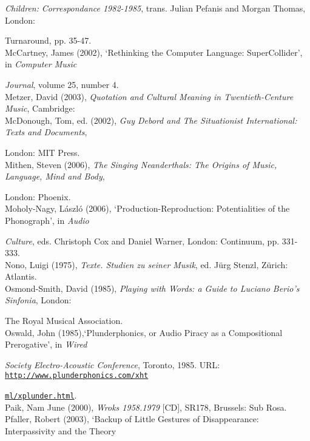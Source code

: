 \emph{Children:} \emph{Correspondance 1982-1985}, trans. Julian Pefanis and Morgan Thomas, London: 

Turnaround, pp. 35-47. 
\hypertarget{mccartney}{}\\
McCartney, James (2002), `Rethinking the Computer Language: SuperCollider', in \emph{Computer Music} 

\emph{Journal}, volume 25, number 4.
\hypertarget{metzer}{}\\
Metzer, David (2003), \emph{Quotation and Cultural Meaning in Twentieth-Centure Music}, Cambridge: 
\hypertarget{mcdonough}{}\\
McDonough, Tom, ed. (2002), \emph{Guy Debord and The Situationist International: Texts and Documents}, 

London: MIT Press. 
\hypertarget{mithen}{}\\
Mithen, Steven (2006), \emph{The Singing Neanderthals: The Origins of Music, Language, Mind and Body}, 

London: Phoenix. 
\hypertarget{moholy}{}\\
Moholy-Nagy, L\'{a}szl\'{o} (2006),  `Production-Reproduction: Potentialities of the Phonograph', in \emph{Audio} 

\emph{Culture}, eds. Christoph Cox and Daniel Warner, London: Continuum, pp. 331-333.
\hypertarget{nono}{}\\
Nono, Luigi (1975), \emph{Texte. Studien zu seiner Musik}, ed. J\"{u}rg Stenzl, Z\"{u}rich: Atlantis. 
\hypertarget{ossmith}{}\\
Osmond-Smith, David (1985), \emph{Playing with Words: a Guide to Luciano Berio's Sinfonia},  London: 

The Royal Musical Association. 
\hypertarget{oswald}{}\\
Oswald, John (1985),`Plunderphonics, or Audio Piracy as a Compositional Prerogative', in \emph{Wired}

\emph{Society Electro-Acoustic Conference}, Toronto, 1985. URL: \href{http://www.plunderphonics.com/xhtml/xplunder.html}{\texttt{http://www.plunderphonics.com/xht}}

\href{http://www.plunderphonics.com/xhtml/xplunder.html}{\texttt{ml/xplunder.html}}.
\hypertarget{paik}{}\\
Paik, Nam June (2000), \emph{Wroks 1958.1979} [CD], SR178, Brussels: Sub Rosa. 
\hypertarget{pfaller}{}\\
Pfaller, Robert (2003), `Backup of Little Gestures of Disappearance: Interpassivity and the Theory 

